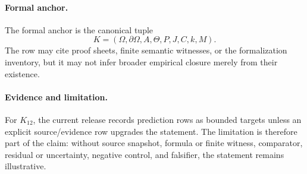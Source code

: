 \paragraph{Formal anchor.}
The formal anchor is the canonical tuple
\[
  K=(\Omega,\partial\Omega,A,\Theta,P,J,C,k,M).
\]
The row may cite proof sheets, finite semantic witnesses, or the formalization
inventory, but it may not infer broader empirical closure merely from their
existence.

\paragraph{Evidence and limitation.}
For \(K_12\), the current release records prediction rows as bounded
targets unless an explicit source/evidence row upgrades the statement. The
limitation is therefore part of the claim: without source snapshot, formula or
finite witness, comparator, residual or uncertainty, negative control, and
falsifier, the statement remains illustrative.
